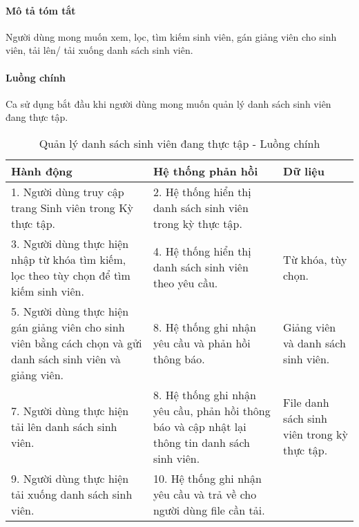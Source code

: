 \documentclass[./../main.tex]{subfiles}
\begin{document}
\paragraph*{Mô tả tóm tắt}

Người dùng mong muốn xem, lọc, tìm kiếm sinh viên, gán giảng viên cho sinh viên, tải lên/ tải xuống danh sách sinh viên.

\paragraph*{Luồng chính} Ca sử dụng bắt đầu khi người dùng mong muốn quản lý danh sách sinh viên đang thực tập.

\begin{table}[H]
	\caption{Quản lý danh sách sinh viên đang thực tập - Luồng chính}
	\label{tab:orgAdmin_manage_internship_students}
	\begin{tabularx}{\textwidth}{|X|X|X|}
		\hline
		\textbf{Hành động}                                                                                            & \textbf{Hệ thống phản hồi}                                                                      & \textbf{Dữ liệu}                            \\ \hline
		1. Người dùng truy cập trang Sinh viên trong Kỳ thực tập.                                                     & 2. Hệ thống hiển thị danh sách sinh viên trong kỳ thực tập.                                     &                                             \\ \hline
		3. Người dùng thực hiện nhập từ khóa tìm kiếm, lọc theo tùy chọn để tìm kiếm sinh viên.                       & 4. Hệ thống hiển thị danh sách sinh viên theo yêu cầu.                                          & Từ khóa, tùy chọn.                          \\ \hline
		5. Người dùng thực hiện gán giảng viên cho sinh viên bằng cách chọn và gửi danh sách sinh viên và giảng viên. & 8. Hệ thống ghi nhận yêu cầu và phản hồi thông báo.                                             & Giảng viên và danh sách sinh viên.          \\ \hline
		7. Người dùng thực hiện tải lên danh sách sinh viên.                                                          & 8. Hệ thống ghi nhận yêu cầu, phản hồi thông báo và cập nhật lại thông tin danh sách sinh viên. & File danh sách sinh viên trong kỳ thực tập. \\ \hline
		9. Người dùng thực hiện tải xuống danh sách sinh viên.                                                        & 10. Hệ thống ghi nhận yêu cầu và trả về cho người dùng file cần tải.                            &                                             \\ \hline
	\end{tabularx}
\end{table}
\end{document}
